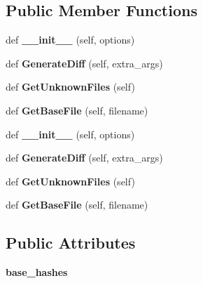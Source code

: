 \subsection*{Public Member Functions}
\begin{DoxyCompactItemize}
\item 
def {\bfseries \+\_\+\+\_\+init\+\_\+\+\_\+} (self, options)\hypertarget{classupload_1_1GitVCS_aba4e1dca1c4b3e5db7ba07f6bce3c839}{}\label{classupload_1_1GitVCS_aba4e1dca1c4b3e5db7ba07f6bce3c839}

\item 
def {\bfseries Generate\+Diff} (self, extra\+\_\+args)\hypertarget{classupload_1_1GitVCS_a3ebfc01cebc9b585706ad3f4389a8833}{}\label{classupload_1_1GitVCS_a3ebfc01cebc9b585706ad3f4389a8833}

\item 
def {\bfseries Get\+Unknown\+Files} (self)\hypertarget{classupload_1_1GitVCS_ae4e8c0e9fa01619c6a5c76d1ab84b995}{}\label{classupload_1_1GitVCS_ae4e8c0e9fa01619c6a5c76d1ab84b995}

\item 
def {\bfseries Get\+Base\+File} (self, filename)\hypertarget{classupload_1_1GitVCS_a70ddb65a6b512b8cb8cc4affa37ff9b4}{}\label{classupload_1_1GitVCS_a70ddb65a6b512b8cb8cc4affa37ff9b4}

\item 
def {\bfseries \+\_\+\+\_\+init\+\_\+\+\_\+} (self, options)\hypertarget{classupload_1_1GitVCS_aba4e1dca1c4b3e5db7ba07f6bce3c839}{}\label{classupload_1_1GitVCS_aba4e1dca1c4b3e5db7ba07f6bce3c839}

\item 
def {\bfseries Generate\+Diff} (self, extra\+\_\+args)\hypertarget{classupload_1_1GitVCS_a3ebfc01cebc9b585706ad3f4389a8833}{}\label{classupload_1_1GitVCS_a3ebfc01cebc9b585706ad3f4389a8833}

\item 
def {\bfseries Get\+Unknown\+Files} (self)\hypertarget{classupload_1_1GitVCS_ae4e8c0e9fa01619c6a5c76d1ab84b995}{}\label{classupload_1_1GitVCS_ae4e8c0e9fa01619c6a5c76d1ab84b995}

\item 
def {\bfseries Get\+Base\+File} (self, filename)\hypertarget{classupload_1_1GitVCS_a70ddb65a6b512b8cb8cc4affa37ff9b4}{}\label{classupload_1_1GitVCS_a70ddb65a6b512b8cb8cc4affa37ff9b4}

\end{DoxyCompactItemize}
\subsection*{Public Attributes}
\begin{DoxyCompactItemize}
\item 
{\bfseries base\+\_\+hashes}\hypertarget{classupload_1_1GitVCS_a07e9469050a157f34fe804cdf6ecddac}{}\label{classupload_1_1GitVCS_a07e9469050a157f34fe804cdf6ecddac}

\end{DoxyCompactItemize}


